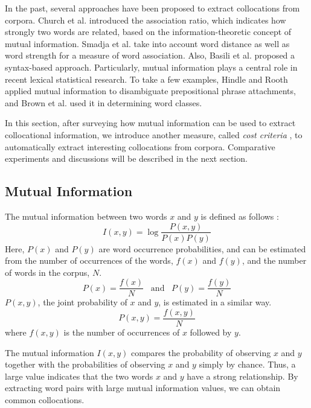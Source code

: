 In the past, several approaches have been proposed to
extract collocations from corpora.
Church et al. \cite{Church90,Church91} introduced the association ratio,
which indicates how strongly two words are related,
based on the information-theoretic concept of mutual information.
Smadja et al. \cite{Smadja90,Smadja91} take into account word distance
as well as word strength for a measure of word association.
Also, Basili et al. \cite{Basili92} proposed a syntax-based approach.
Particularly, mutual information plays a central role
in recent lexical statistical research.
To take a few examples,
Hindle and Rooth \cite{Hindle93} applied mutual information to disambiguate
prepositional phrase attachments,
and Brown et al. \cite{Brown92} used it in determining word classes.

In this section, after surveying how mutual information
can be used to extract collocational information,
we introduce another measure, called {\em cost criteria} \cite{Kita93},
to automatically extract interesting collocations
from corpora.
Comparative experiments and discussions will be described
in the next section.

\subsection{Mutual Information}

The mutual information between two words $x$ and $y$ is defined
as follows \cite{Church90,Church91}:
\begin{equation}
  I(x,y) = \log \frac{P(x,y)}{P(x)P(y)}
\end{equation}
Here, $P(x)$ and $P(y)$ are word occurrence probabilities,
and can be estimated from the number of occurrences of the words, $f(x)$ and $f(y)$,
and the number of words in the corpus, $N$.
\begin{equation}
  P(x) = \frac{f(x)}{N} \,\,\,\,\, \mbox{and} \,\,\,\,\, P(y) = \frac{f(y)}{N}
\end{equation}
$P(x,y)$, the joint probability of $x$ and $y$, is estimated in a similar way.
\begin{equation}
  P(x,y) = \frac{f(x,y)}{N}
\end{equation}
where $f(x,y)$ is the number of occurrences of
$x$ followed by $y$.

The mutual information $I(x,y)$ compares the probability
of observing $x$ and $y$ together
with the probabilities of observing $x$ and $y$ simply by chance.
Thus, a large value indicates that the two words $x$ and $y$
have a strong relationship.
By extracting word pairs with large mutual information values,
we can obtain common collocations.

